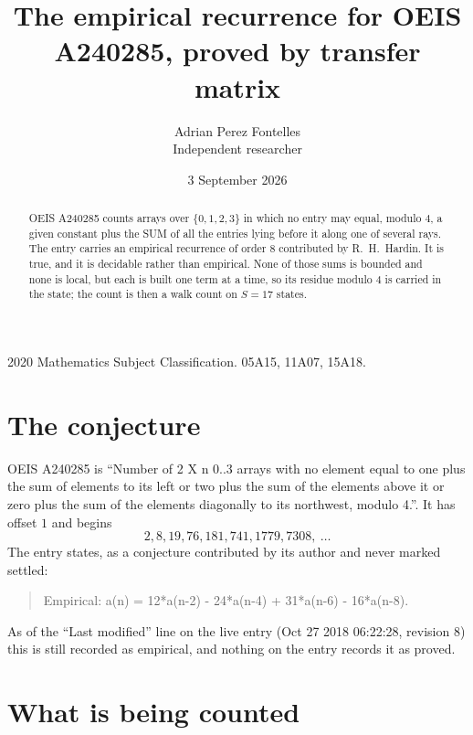 \documentclass[11pt,a4paper]{article}
\title{The empirical recurrence for OEIS A240285, proved by transfer matrix}
\author{Adrian Perez Fontelles\\ \small Independent researcher}
\date{3 September 2026}
\theoremstyle{plain}
\theoremstyle{definition}
\begin{document}
\maketitle

\begin{abstract}
OEIS A240285 counts arrays over $\{0,1,2,3\}$ in which no entry may equal, modulo $4$, a given
constant plus the SUM of all the entries lying before it along one of several rays. The entry
carries an empirical recurrence of order $8$ contributed by R.~H.~Hardin. It is true, and
it is decidable rather than empirical. None of those sums is bounded and none is local, but
each is built one term at a time, so its residue modulo $4$ is carried in the state; the
count is then a walk count on $S=17$ states.
\end{abstract}

\noindent\small 2020 Mathematics Subject Classification. 05A15, 11A07, 15A18.\normalsize

\section{The conjecture}

OEIS A240285 is ``Number of 2 X n 0..3 arrays with no element equal to one plus the sum of elements to its left or two plus the sum of the elements above it or zero plus the sum of the elements diagonally to its northwest, modulo 4.''. It has offset $1$ and begins
\[
2, 8, 19, 76, 181, 741, 1779, 7308,\ \dots
\]
The entry states, as a conjecture contributed by its author and never marked settled:
\begin{quote}
Empirical: a(n) = 12*a(n-2) - 24*a(n-4) + 31*a(n-6) - 16*a(n-8).
\end{quote}
As of the ``Last modified'' line on the live entry (Oct 27 2018 06:22:28, revision 8) this is still
recorded as empirical, and nothing on the entry records it as proved.

\section{What is being counted}
\end{document}
